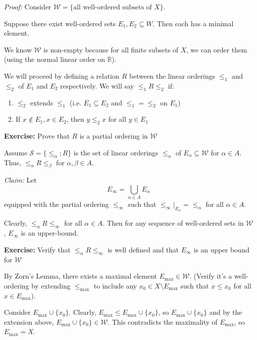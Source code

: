 \documentclass[12pt]{article}
\newcommand{\R}{\mathbb{R}}
\newcommand{\sub}{\subseteq}
\newenvironment*{tbox}[2][gray]{
    \begin{tcolorbox}[
        parbox=false,
        colback=#1!5!white,
        colframe=#1!75!black,
        breakable,
        title={#2}
    ]}
    {\end{tcolorbox}}
\newenvironment*{exercise}[1][red]{
    \begin{tcolorbox}[
        parbox=false,
        colback=#1!5!white,
        colframe=#1!75!black,
        breakable
    ]}
    {\end{tcolorbox}}
\begin{document}
    \begin{tbox}{\textbf{Well-ordering Principle:} Every non-empty set $X$ can be well-ordered}
        \emph{Proof:} Consider $\mathcal{W} = \{\text{all well-ordered subsets of } X\}$.
        
        Suppose there exist well-ordered sets $E_1, E_2 \sub W$. Then each has a minimal element.  

        We know $\mathcal W$ is non-empty because for all finite subsets of $X$, we can order them (using the normal linear order on $\R$). 

        We will proceed by defining a relation $R$ between the linear orderings $\leq_1$ and $\leq_2$ of $E_1$ and $E_2$ respectively. We will say $\leq_1 R \leq_2$ if:
        \begin{enumerate}
            \item $\leq_2$ extends $\leq_1$ (i.e. $E_1 \sub E_2$ and $\leq_1 = \leq_2$ on $E_1$)
            \item If $x \notin E_1, x \in E_2$, then $y \leq_2 x$ for all $y \in E_1$
        \end{enumerate}

        \begin{exercise}
            \textbf{Exercise:} Prove that $R$ is a partial ordering in $\mathcal W$
        \end{exercise}
        
        Assume $\mathcal S = \{\leq_{\alpha} ; R\}$ is the set of linear orderings $\leq_{\alpha}$ of $E_{\alpha} \sub \mathcal W$ for $\alpha \in A$. Thus, $\leq_{\alpha} R \leq_{\beta}$ for $\alpha, \beta \in A$.

        \emph{Claim:} Let
        \[E_{\infty} = \bigcup_{\alpha \in A} E_{\alpha}\]
        equipped with the partial ordering $\leq_{\infty}$ such that $\leq_{\infty}\big\vert_{E_{\alpha}} = \leq_{\alpha}$ for all $\alpha \in A$. 

        Clearly, $\leq_{\alpha} R \leq_{\infty}$ for all $\alpha \in A$. Then for any sequence of well-ordered sets in $\mathcal W$, $E_{\infty}$ is an upper-bound. 
        
        \begin{exercise}
            \textbf{Exercise:} Verify that $\leq_{\alpha} R \leq_{\infty}$ is well defined and that $E_{\infty}$ is an upper bound for $\mathcal W$
        \end{exercise}

        By Zorn's Lemma, there exists a maximal element $E_{\max} \in \mathcal W$. (Verify it's a well-ordering by extending $\leq_{\max}$ to include any $x_0 \in X\setminus E_{\max}$ such that $x \leq x_0$ for all $x \in E_{\max}$).
        
        Consider $E_{\max} \cup \{x_0\}$. Clearly, $E_{\max} \leq E_{\max} \cup \{x_0\}$, so $E_{\max} \cup \{x_0\}$ and by the extension above, $E_{\max} \cup \{x_0\} \in \mathcal W$. This contradicts the maximality of $E_{\max}$, so $E_{\max} = X$.
    \end{tbox}
\end{document}
